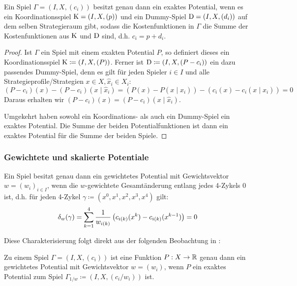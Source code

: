 \begin{satz}\label{satz:CharExPotAlt}
	Ein Spiel $\Gamma = (I, X, (c_i))$ besitzt genau dann ein exaktes Potential, wenn es ein Koordinationsspiel $\mathrm{K} = (I, X, (p))$ und ein Dummy-Spiel $\mathrm{D} = (I, X, (d_i))$ auf dem selben Strategieraum gibt, sodass die Kostenfunktionen in $\Gamma$ die Summe der Kostenfunktionen aus $\mathrm{K}$ und $\mathrm{D}$ sind, d.h. $c_i = p + d_i$.
\end{satz}

\begin{proof}
	Ist $\Gamma$ ein Spiel mit einem exakten Potential $P$, so definiert dieses ein Koordinationsspiel $\mathrm{K} \coloneqq (I, X, (P))$. Ferner ist $\mathrm{D} \coloneqq (I, X, (P-c_i))$ ein dazu passendes Dummy-Spiel, denn es gilt für jeden Spieler $i \in I$ und alle Strategieprofile/Strategien $x \in X, \hat{x}_i \in X_i$:
		\[(P-c_i)(x) - (P-c_i)(x \mid \hat{x}_i) = \left(P(x) - P(x \mid \hat{x}_i)\right) - \left(c_i(x) - c_i(x \mid \hat{x}_i)\right) = 0 \]
	Daraus erhalten wir $(P-c_i)(x) = (P-c_i)(x \mid \hat{x}_i)$.
	
	Umgekehrt haben sowohl ein Koordinations- als auch ein Dummy-Spiel ein exaktes Potential. Die Summe der beiden Potentialfunktionen ist dann ein exaktes Potential für die Summe der beiden Spiele.
\end{proof}


\subsubsection{Gewichtete und skalierte Potentiale}

\begin{satz}\label{satz:CharGewPot}
	Ein Spiel besitzt genau dann ein gewichtetes Potential mit Gewichtsvektor $w = (w_i)_{i \in I}$, wenn die $w$-gewichtete Gesamtänderung entlang jedes 4-Zykels $0$ ist, d.h. für jeden 4-Zykel $\gamma \coloneqq (x^0, x^1, x^2, x^3, x^4)$ gilt:
		\[\delta_w(\gamma) = \sum_{k=1}^4 \frac{1}{w_{i(k)}}\left(c_{i(k)}(x^k) - c_{i(k)}(x^{k-1})\right) = 0\]
\end{satz}

Diese Charakterisierung folgt direkt aus der folgenden Beobachtung in \cite[Kapitel 3.2]{CharExGewPotinWCG}:

\begin{beob}\label{beob:ZshExGewPot}
	Zu einem Spiel $\Gamma = (I, X, (c_i))$ ist eine Funktion $P: X \to \mathbb{R}$ genau dann ein gewichtetes Potential mit Gewichtsvektor $w = (w_i)$, wenn $P$ ein exaktes Potential zum Spiel $\Gamma_{1/w} \coloneqq (I, X, (c_i/w_i))$ ist.
\end{beob}

